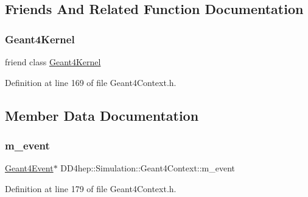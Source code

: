 \subsection{Friends And Related Function Documentation}
\hypertarget{class_d_d4hep_1_1_simulation_1_1_geant4_context_ade874a98c0c1bcb1b8c2d456037b3f5a}{}\label{class_d_d4hep_1_1_simulation_1_1_geant4_context_ade874a98c0c1bcb1b8c2d456037b3f5a} 
\subsubsection{\texorpdfstring{Geant4\+Kernel}{Geant4Kernel}}
{\footnotesize\ttfamily friend class \hyperlink{class_d_d4hep_1_1_simulation_1_1_geant4_kernel}{Geant4\+Kernel}\hspace{0.3cm}{\ttfamily [friend]}}



Definition at line 169 of file Geant4\+Context.\+h.



\subsection{Member Data Documentation}
\hypertarget{class_d_d4hep_1_1_simulation_1_1_geant4_context_a3aba509b9246b6e8b8c89a9bf61b9a4c}{}\label{class_d_d4hep_1_1_simulation_1_1_geant4_context_a3aba509b9246b6e8b8c89a9bf61b9a4c} 
\subsubsection{\texorpdfstring{m\+\_\+event}{m\_event}}
{\footnotesize\ttfamily \hyperlink{class_d_d4hep_1_1_simulation_1_1_geant4_event}{Geant4\+Event}$\ast$ D\+D4hep\+::\+Simulation\+::\+Geant4\+Context\+::m\+\_\+event\hspace{0.3cm}{\ttfamily [protected]}}



Definition at line 179 of file Geant4\+Context.\+h.



